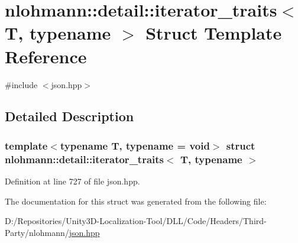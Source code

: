 \hypertarget{structnlohmann_1_1detail_1_1iterator__traits}{}\section{nlohmann\+::detail\+::iterator\+\_\+traits$<$ T, typename $>$ Struct Template Reference}
\label{structnlohmann_1_1detail_1_1iterator__traits}


{\ttfamily \#include $<$json.\+hpp$>$}



\subsection{Detailed Description}
\subsubsection*{template$<$typename T, typename = void$>$\newline
struct nlohmann\+::detail\+::iterator\+\_\+traits$<$ T, typename $>$}



Definition at line 727 of file json.\+hpp.



The documentation for this struct was generated from the following file\+:\begin{DoxyCompactItemize}
\item 
D\+:/\+Repositories/\+Unity3\+D-\/\+Localization-\/\+Tool/\+D\+L\+L/\+Code/\+Headers/\+Third-\/\+Party/nlohmann/\mbox{\hyperlink{json_8hpp}{json.\+hpp}}\end{DoxyCompactItemize}
